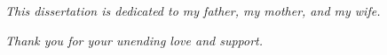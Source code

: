 \newpage
\fchapter[Dedication]{}
\thispagestyle{plain}
\vfil\null
\begin{center}

\mbox{}\vspace{3in}

\emph{
This dissertation is dedicated to my father, my mother, and my wife.}

\emph{
Thank you for your unending love and support.
}

\end{center} 
\normalsize
\vfil\null
